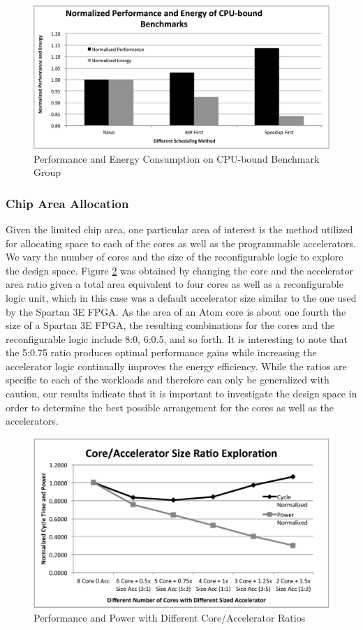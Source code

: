 \begin{figure}
    \centering
    \includegraphics[width=4.5in]{CPU-Bounded}
    \caption{Performance and Energy Consumption on CPU-bound Benchmark Group}
    \label{fig_cpu_bound}
\end{figure}


\subsubsection{Chip Area Allocation}

Given the limited chip area, one particular area of interest is the method utilized for allocating space
 to each of the cores as well as the programmable accelerators.
We vary the number of cores and the size of the
reconfigurable logic to explore the design space. Figure
\ref{fig_core_acc_ratio} was obtained by changing the core and
the accelerator area ratio given a total area equivalent to four cores
as well as a reconfigurable logic unit, which in this case was a default accelerator size similar to the one used
by the Spartan 3E FPGA. As the area of an Atom core is about
    one fourth the size of a Spartan 3E FPGA, the resulting combinations for the cores and the reconfigurable
logic include 8:0, 6:0.5, and so forth. It is interesting to note that the
 5:0.75 ratio produces optimal performance gains while increasing the accelerator
logic continually improves the energy efficiency. While the ratios are
specific to each of the workloads and therefore can only be generalized with caution, 
our results indicate that it is important to
investigate the design space in order to determine the best possible
arrangement for the cores as well as the accelerators. 

\begin{figure}
    \centering
    \includegraphics[width=4.5in]{Core-Acc-Size-Ratio}
    \caption{Performance and Power with Different Core/Accelerator Ratios}
    \label{fig_core_acc_ratio}
\end{figure}

